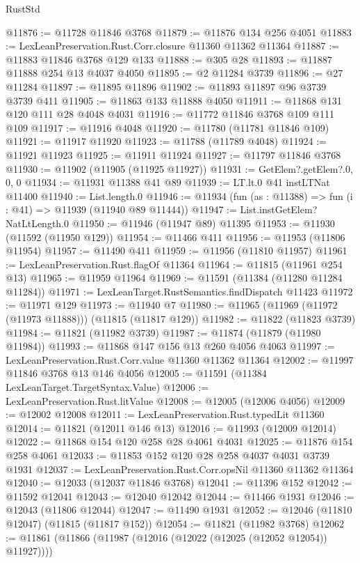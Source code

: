 \begin{lexlean}{RustStd}
\begin{coremodule}
@11876 := @11728 @11846 @3768
@11879 := @11876 @134 @256 @4051
@11883 := LexLeanPreservation.Rust.Corr.closure @11360 @11362 @11364
@11887 := @11883 @11846 @3768 @129 @133
@11888 := @305 @28
@11893 := @11887 @11888 @254 @13 @4037 @4050
@11895 := @2 @11284 @3739
@11896 := @27 @11284
@11897 := @11895 @11896
@11902 := @11893 @11897 @96 @3739 @3739 @411
@11905 := @11863 @133 @11888 @4050
@11911 := @11868 @131 @120 @111 @28 @4048 @4031
@11916 := @11772 @11846 @3768 @109 @111 @109
@11917 := @11916 @4048
@11920 := @11780 (@11781 @11846 @109)
@11921 := @11917 @11920
@11923 := @11788 (@11789 @4048)
@11924 := @11921 @11923
@11925 := @11911 @11924
@11927 := @11797 @11846 @3768
@11930 := @11902 (@11905 (@11925 @11927))
@11931 := GetElem?.getElem?.{0, 0, 0}
@11934 := @11931 @11388 @41 @89
@11939 := LT.lt.{0} @41 instLTNat @11400
@11940 := List.length.{0}
@11946 := @11934 (fun (as : @11388) => fun (i : @41) => @11939 (@11940 @89 @11444))
@11947 := List.instGetElem?NatLtLength.{0}
@11950 := @11946 (@11947 @89) @11395
@11953 := @11930 (@11592 (@11950 @129))
@11954 := @11466 @411
@11956 := @11953 (@11806 @11954)
@11957 := @11490 @411
@11959 := @11956 (@11810 @11957)
@11961 := LexLeanPreservation.Rust.flagOf @11364
@11964 := @11815 (@11961 @254 @13)
@11965 := @11959 @11964
@11969 := @11591 (@11384 (@11280 @11284 @11284))
@11971 := LexLeanTarget.RustSemantics.findDispatch @11423
@11972 := @11971 @129
@11973 := @11940 @7
@11980 := @11965 (@11969 (@11972 (@11973 @11888))) (@11815 (@11817 @129))
@11982 := @11822 (@11823 @3739)
@11984 := @11821 (@11982 @3739)
@11987 := @11874 (@11879 (@11980 @11984))
@11993 := @11868 @147 @156 @13 @260 @4056 @4063
@11997 := LexLeanPreservation.Rust.Corr.value @11360 @11362 @11364
@12002 := @11997 @11846 @3768 @13 @146 @4056
@12005 := @11591 (@11384 LexLeanTarget.TargetSyntax.Value)
@12006 := LexLeanPreservation.Rust.litValue
@12008 := @12005 (@12006 @4056)
@12009 := @12002 @12008
@12011 := LexLeanPreservation.Rust.typedLit @11360
@12014 := @11821 (@12011 @146 @13)
@12016 := @11993 (@12009 @12014)
@12022 := @11868 @154 @120 @258 @28 @4061 @4031
@12025 := @11876 @154 @258 @4061
@12033 := @11853 @152 @120 @28 @258 @4037 @4031 @3739 @1931
@12037 := LexLeanPreservation.Rust.Corr.opsNil @11360 @11362 @11364
@12040 := @12033 (@12037 @11846 @3768)
@12041 := @11396 @152
@12042 := @11592 @12041
@12043 := @12040 @12042
@12044 := @11466 @1931
@12046 := @12043 (@11806 @12044)
@12047 := @11490 @1931
@12052 := @12046 (@11810 @12047) (@11815 (@11817 @152))
@12054 := @11821 (@11982 @3768)
@12062 := @11861 (@11866 (@11987 (@12016 (@12022 (@12025 (@12052 @12054)) @11927))))

\end{coremodule}
\end{lexlean}
